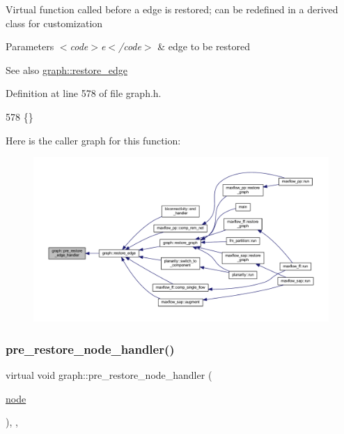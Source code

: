Virtual function called before a edge is restored; can be redefined in a derived class for customization


\begin{DoxyParams}{Parameters}
{\em $<$code$>$e$<$/code$>$} & edge to be restored \\
\hline
\end{DoxyParams}
\begin{DoxySeeAlso}{See also}
\mbox{\hyperlink{classgraph_a2e5426682a0897b9f9104b019970bedc}{graph\+::restore\+\_\+edge}} 
\end{DoxySeeAlso}


Definition at line 578 of file graph.\+h.


\begin{DoxyCode}
578 \{\}       
\end{DoxyCode}
Here is the caller graph for this function\+:
\nopagebreak
\begin{figure}[H]
\begin{center}
\leavevmode
\includegraphics[width=350pt]{classgraph_a569d227d9f4914278a143d52139e3303_icgraph}
\end{center}
\end{figure}
\mbox{\label{classgraph_a3a305d240ab5237a2adae315b50105a6}} 
\subsubsection{\texorpdfstring{pre\+\_\+restore\+\_\+node\+\_\+handler()}{pre\_restore\_node\_handler()}}
{\footnotesize\ttfamily virtual void graph\+::pre\+\_\+restore\+\_\+node\+\_\+handler (\begin{DoxyParamCaption}\item[{\mbox{\hyperlink{classnode}{node}}}]{ }\end{DoxyParamCaption})\hspace{0.3cm}{\ttfamily [inline]}, {\ttfamily [virtual]}, {\ttfamily [inherited]}}

